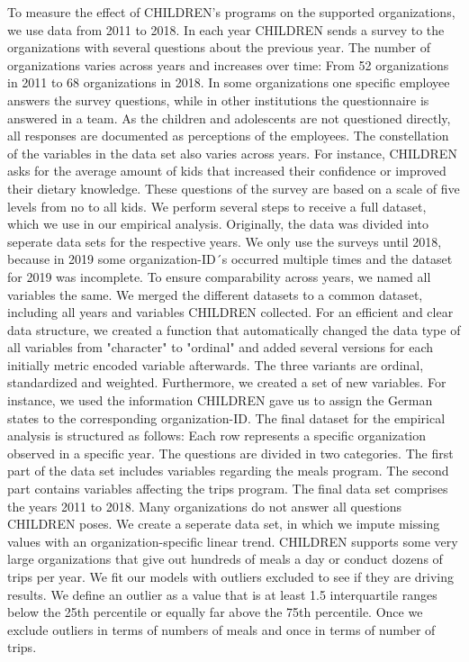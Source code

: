 \documentclass[12pt, a4paper, titlepage]{article}\usepackage[]{graphicx}\usepackage[]{color}
\begin{document}
To measure the effect of CHILDREN's programs on the supported organizations, we use data from 2011 to 2018. In each year CHILDREN sends a survey to the organizations with several questions about the previous year. The number of organizations varies across years and increases over time: From 52 organizations in 2011 to 68 organizations in 2018. In some organizations one specific employee answers the survey questions, while in other institutions the questionnaire is answered in a team. As the children and adolescents are not questioned directly, all responses are documented as perceptions of the employees. The constellation of the variables in the data set also varies across years. For instance, CHILDREN asks for the average amount of kids that increased their confidence or improved their dietary knowledge. These questions of the survey are based on a scale of five levels from no to all kids. We perform several steps to receive a full dataset, which we use in our empirical analysis. Originally, the data was divided into seperate data sets for the respective years. We only use the surveys until 2018, because in 2019 some organization-ID´s occurred multiple times and the dataset for 2019 was incomplete. To ensure comparability across years, we named all variables the same. We merged the different datasets to a common dataset, including all years and variables CHILDREN collected. For an efficient and clear data structure, we created a function that automatically changed the data type of all variables from "character" to "ordinal" and added several versions for each initially metric encoded variable afterwards. The three variants are ordinal, standardized and weighted.
Furthermore, we created a set of new variables. For instance, we used the information CHILDREN gave us to assign the German states to the corresponding organization-ID. 
The final dataset for the empirical analysis is structured as follows: Each row represents a specific organization observed in a specific year. The questions are divided in two categories. The first part of the data set includes variables regarding the meals program. The second part contains variables affecting the trips program. The final data set comprises the years 2011 to 2018.
Many organizations do not answer all questions CHILDREN poses. We create a seperate data set, in which we impute missing values with an organization-specific linear trend. CHILDREN supports some very large organizations that give out hundreds of meals a day or conduct dozens of trips per year. We fit our models with outliers excluded to see if they are driving results. We define an outlier as a value that is at least 1.5 interquartile ranges below the 25th percentile or equally far above the 75th percentile. Once we exclude outliers in terms of numbers of meals and once in terms of number of trips.
\end{document}
